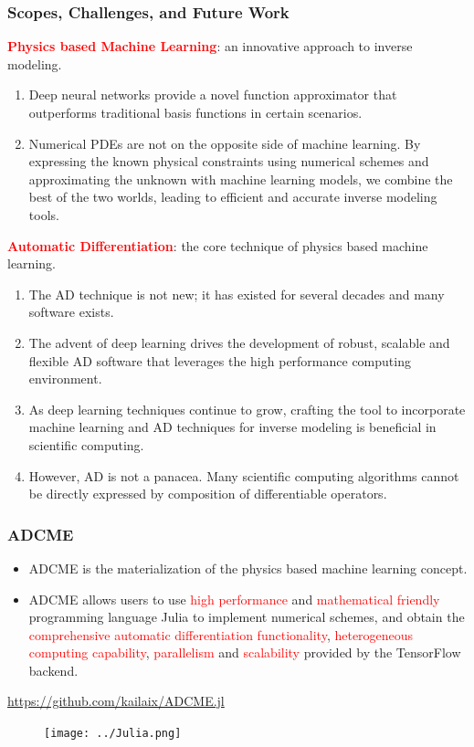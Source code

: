 \documentclass{beamer}
\begin{document}
\begin{frame}
	\frametitle{Scopes, Challenges, and Future Work}
	\textcolor{red}{\textbf{Physics based Machine Learning}}: an innovative approach to inverse modeling. 
	{\scriptsize
	\begin{enumerate}
		\item Deep neural networks provide a novel function approximator that outperforms traditional basis functions in certain scenarios. 
		\item Numerical PDEs are not on the opposite side of machine learning. By expressing the known physical constraints using numerical schemes and approximating the unknown with machine learning models, we combine the best of the two worlds, leading to efficient and accurate inverse modeling tools. 
	\end{enumerate}
	}
		
		\textcolor{red}{\textbf{Automatic Differentiation}}: the core technique of physics based machine learning.
		{\scriptsize
		\begin{enumerate}
		\item The AD technique is not new; it has existed for several decades and many software exists. 
		\item The advent of deep learning drives the development of robust, scalable and flexible AD software that leverages the high performance computing environment. 
		\item As deep learning techniques continue to grow, crafting the tool to incorporate machine learning and AD techniques for inverse modeling is beneficial in scientific computing.
		\item However, AD is not a panacea. Many scientific computing algorithms cannot be directly expressed by composition of differentiable operators. 
	\end{enumerate}
	}
	
\end{frame}

\begin{frame}
	\frametitle{ADCME}
	\begin{itemize}
	\item ADCME is the materialization of the physics based machine learning concept. 
		\item ADCME allows users to use \textcolor{red}{high performance} and \textcolor{red}{mathematical friendly} programming language Julia to implement numerical schemes, and obtain the \textcolor{red}{comprehensive automatic differentiation functionality}, \textcolor{red}{heterogeneous computing capability}, \textcolor{red}{parallelism} and \textcolor{red}{scalability} provided by the TensorFlow backend. 
	\end{itemize}
	\begin{center}
		\url{https://github.com/kailaix/ADCME.jl}
	\end{center}
	\vspace{-0.3cm}
	\begin{figure}[hbt]
  \texttt{[image: ../Julia.png]}
\end{figure}
\end{frame}
\end{document}
